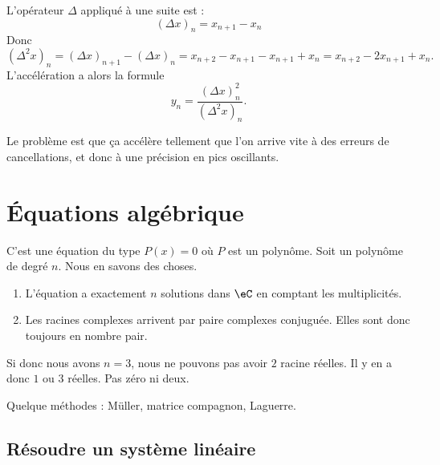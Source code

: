 L'opérateur \( \Delta\) appliqué à une suite est :
\begin{equation}
    (\Delta x)_n=x_{n+1}-x_n
\end{equation}
Donc
\begin{equation}
    (\Delta^2x)_n= (\Delta x)_{n+1}-(\Delta x)_n=x_{n+2}-x_{n+1}-x_{n+1}+x_n=x_{n+2}-2x_{n+1}+x_n.
\end{equation}
L'accélération a alors la formule
\begin{equation}
    y_n=\frac{ (\Delta x)_n^2 }{ (\Delta^2x)_n }.
\end{equation}

Le problème est que ça accélère tellement que l'on arrive vite à des erreurs de cancellations, et donc à une précision en pics oscillants.

\section{Équations algébrique}

C'est une équation du type \( P(x)=0\) où \( P\) est un polynôme. Soit un polynôme de degré \( n\). Nous en savons des choses.

\begin{enumerate}
    \item
        L'équation a exactement \( n\) solutions dans \( \eC\) en comptant les multiplicités.
    \item
        Les racines complexes arrivent par paire complexes conjuguée. Elles sont donc toujours en nombre pair.
\end{enumerate}

Si donc nous avons \( n=3\), nous ne pouvons pas avoir \( 2\) racine réelles. Il y en a donc \( 1\) ou \( 3\) réelles. Pas zéro ni deux.

Quelque méthodes : Müller, matrice compagnon, Laguerre.

\subsection{Résoudre un système linéaire}

